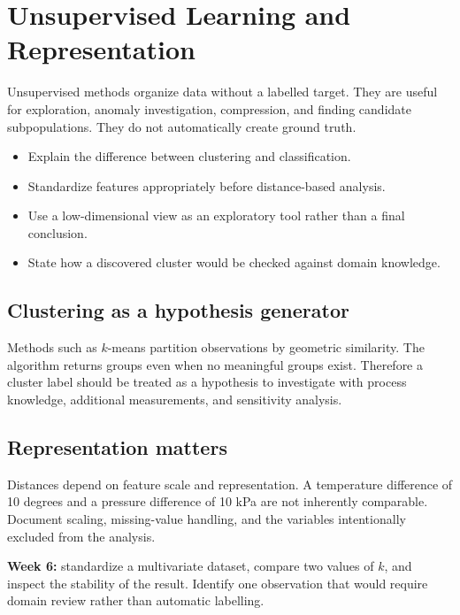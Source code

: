 \chapter{Unsupervised Learning and Representation}\label{chap:unsupervised}
 Unsupervised methods organize data without a labelled target. They are useful for exploration, anomaly investigation, compression, and finding candidate subpopulations. They do not automatically create ground truth.

\begin{learningbox}
\begin{itemize}
  \item Explain the difference between clustering and classification.
  \item Standardize features appropriately before distance-based analysis.
  \item Use a low-dimensional view as an exploratory tool rather than a final conclusion.
  \item State how a discovered cluster would be checked against domain knowledge.
\end{itemize}
\end{learningbox}

\section{Clustering as a hypothesis generator}
Methods such as $k$-means partition observations by geometric similarity. The algorithm returns groups even when no meaningful groups exist. Therefore a cluster label should be treated as a hypothesis to investigate with process knowledge, additional measurements, and sensitivity analysis.

\section{Representation matters}
Distances depend on feature scale and representation. A temperature difference of 10 degrees and a pressure difference of 10 kPa are not inherently comparable. Document scaling, missing-value handling, and the variables intentionally excluded from the analysis.

\begin{labbox}
\textbf{Week 6:} standardize a multivariate dataset, compare two values of $k$, and inspect the stability of the result. Identify one observation that would require domain review rather than automatic labelling.
\end{labbox}

